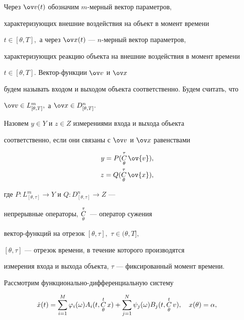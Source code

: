 Через $\ov v(t)$ обозначим $m$-мерный вектор параметров, 


характеризующих внешние воздействия на объект в момент времени


$t\in[\theta,T],$ а через $\ov x(t)$ --- $n$-мерный вектор параметров,


характеризующих реакцию объекта на внешние воздействия в момент времени


$t\in[\theta,T].$ Вектор-функции $\ov v$ и $\ov x$


будем называть входом и выходом объекта соответственно. Будем считать, что


$\ov v\in L^m_{[\theta,T]},$ а $\ov x\in D^n_{[\theta,T]}.$





Назовем $y\in Y$ и $z\in Z$ измерениями входа и выхода объекта 


соответственно, если они связаны с $\ov v$ и $\ov x$ равенствами


\begin{align}


y = P(\updown{\theta}{\tau} \ov{v}),\\


z = Q(\updown{\theta}{\tau} \ov{x}),


\end{align}


где $P:L^m_{[\theta,\tau]}\to Y$ и $Q:D^n_{[\theta,\tau]}\to Z$ ---


непрерывные операторы, $\underset{\theta}{\overset{\tau}{C}}{}\,$ --- оператор сужения


вектор-функций на отрезок $[\theta,\tau],$ $\tau\in(\theta,T],$


$[\theta,\tau]$ --- отрезок времени, в течение которого производятся


измерения входа и выхода объекта, $\tau$ --- фиксированный момент времени.





Рассмотрим функционально-дифференциальную систему


\begin{equation}


\Dot{x}(t) = \sum_{i=1}^M \varphi_i(\omega) A_i(t,\updown{\theta}{t} x) +


\sum_{j=1}^N \psi_j(\omega) B_j(t,\updown{\theta}{t} v),\quad


x(\theta)=\alpha,


\end{equation}



